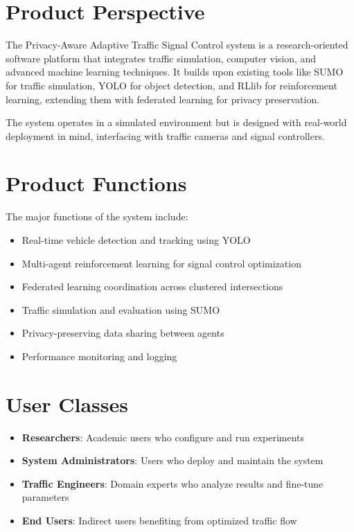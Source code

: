 \section{Product Perspective}

The Privacy-Aware Adaptive Traffic Signal Control system is a research-oriented software platform that integrates traffic simulation, computer vision, and advanced machine learning techniques. It builds upon existing tools like SUMO for traffic simulation, YOLO for object detection, and RLlib for reinforcement learning, extending them with federated learning for privacy preservation.

The system operates in a simulated environment but is designed with real-world deployment in mind, interfacing with traffic cameras and signal controllers.

\section{Product Functions}

The major functions of the system include:
\begin{itemize}
\item Real-time vehicle detection and tracking using YOLO
\item Multi-agent reinforcement learning for signal control optimization
\item Federated learning coordination across clustered intersections
\item Traffic simulation and evaluation using SUMO
\item Privacy-preserving data sharing between agents
\item Performance monitoring and logging
\end{itemize}

\section{User Classes}

\begin{itemize}
\item \textbf{Researchers}: Academic users who configure and run experiments
\item \textbf{System Administrators}: Users who deploy and maintain the system
\item \textbf{Traffic Engineers}: Domain experts who analyze results and fine-tune parameters
\item \textbf{End Users}: Indirect users benefiting from optimized traffic flow
\end{itemize}

